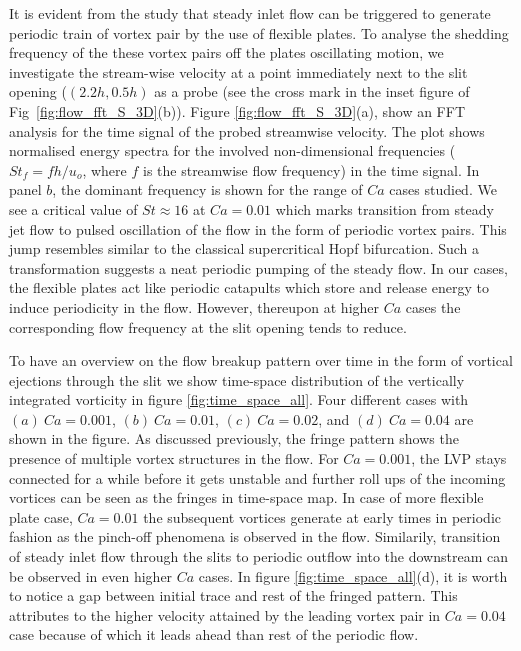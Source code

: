 \documentclass[final,3p,10pt,times,review,authoryear]{elsarticle}
\begin{document}
	It is evident from the study that steady inlet flow can be triggered to generate periodic train of vortex pair by the use of flexible plates. To analyse the shedding frequency of the these vortex pairs off the plates oscillating motion, we investigate the stream-wise velocity at a point immediately next to the slit opening ($(2.2h,0.5h)$ as a probe (see the cross mark in the inset figure of Fig~\ref{fig:flow_fft_S_3D}(b)). %
	Figure \ref{fig:flow_fft_S_3D}(a), show an FFT analysis for the time signal of the probed streamwise velocity. The plot shows normalised energy spectra for the involved non-dimensional frequencies ($St_f=fh/u_{o}$, where $f$ is the streamwise flow frequency) in the time signal. In panel $b$, the dominant frequency is shown for the range of $Ca$ cases studied. We see a critical value of $St \approx 16$ at $Ca=0.01$ which marks transition from steady jet flow to pulsed oscillation of the flow in the form of periodic vortex pairs. This jump resembles similar to the classical supercritical Hopf bifurcation. Such a transformation suggests a neat periodic pumping of the steady flow. In our cases, the flexible plates act like periodic catapults which store and release energy to induce periodicity in the flow. However, thereupon at higher $Ca$ cases the corresponding flow frequency at the slit opening tends to reduce.
	
	To have an overview on the flow breakup pattern over time in the form of vortical ejections through the slit we show time-space distribution of the vertically integrated vorticity in figure \ref{fig:time_space_all}. Four different cases with $(a)\ Ca=0.001$, $(b)\ Ca=0.01$, $(c)\ Ca=0.02$, and $(d)\ Ca=0.04$ are shown in the figure. As discussed previously, the fringe pattern shows the presence of multiple vortex structures in the flow. For $Ca=0.001$, the LVP stays connected for a while before it gets unstable and further roll ups of the incoming vortices can be seen as the fringes in time-space map. In case of more flexible plate case, $Ca=0.01$ the subsequent vortices generate at early times in periodic fashion as the pinch-off phenomena is observed in the flow. Similarily, transition of steady inlet flow through the slits to periodic outflow into the downstream can be observed in even higher $Ca$ cases. In figure \ref{fig:time_space_all}(d), it is worth to notice a gap between initial trace and rest of the fringed pattern. This attributes to the higher velocity attained by the leading vortex pair in $Ca=0.04$ case because of which it leads ahead than rest of the periodic flow.
	
\end{document}
